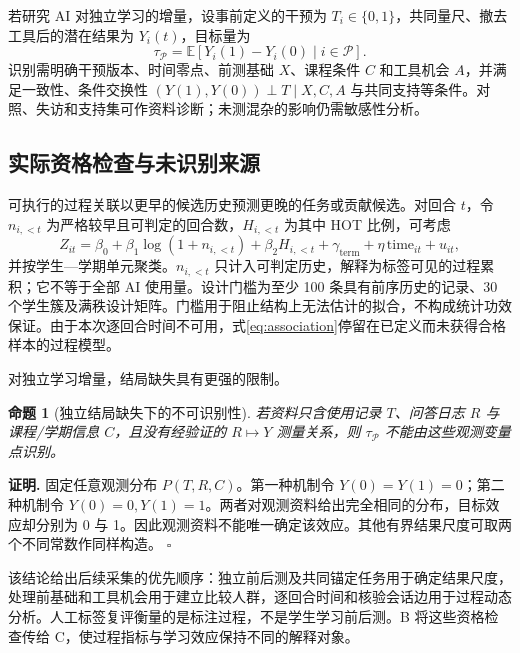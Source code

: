 \documentclass[withoutpreface,bwprint]{cumcmthesis}
\newtheorem{proposition}{命题}[section]
\renewenvironment{proof}{\par\noindent\textbf{证明. }\ignorespaces}{\unskip\hfill$\square$\par}
\newcommand{\E}{\mathbb{E}}
\begin{document}
若研究 AI 对独立学习的增量，设事前定义的干预为 $T_i\in\{0,1\}$，共同量尺、撤去工具后的潜在结果为 $Y_i(t)$，目标量为
\begin{equation}\label{eq:ate}
\tau_{\mathcal P}=\E[Y_i(1)-Y_i(0)\mid i\in\mathcal P].
\end{equation}
识别需明确干预版本、时间零点、前测基础 $X$、课程条件 $C$ 和工具机会 $A$，并满足一致性、条件交换性 $(Y(1),Y(0))\perp T\mid X,C,A$ 与共同支持等条件\cite{hernan2020_whatif}。对照、失访和支持集可作资料诊断；未测混杂的影响仍需敏感性分析\cite{lu2023_sensitivity}。

\subsection{实际资格检查与未识别来源}
\FinalAssociationResults{}

可执行的过程关联以更早的候选历史预测更晚的任务或贡献候选。对回合 $t$，令 $n_{i,<t}$ 为严格较早且可判定的回合数，$H_{i,<t}$ 为其中 HOT 比例，可考虑
\begin{equation}\label{eq:association}
Z_{it}=\beta_0+\beta_1\log(1+n_{i,<t})+\beta_2H_{i,<t}
+\gamma_{\mathrm{term}}+\eta\,\mathrm{time}_{it}+u_{it},
\end{equation}
并按学生—学期单元聚类。$n_{i,<t}$ 只计入可判定历史，解释为标签可见的过程累积；它不等于全部 AI 使用量。设计门槛为至少 100 条具有前序历史的记录、30 个学生簇及满秩设计矩阵。门槛用于阻止结构上无法估计的拟合，不构成统计功效保证。由于本次逐回合时间不可用，式\eqref{eq:association}停留在已定义而未获得合格样本的过程模型。

对独立学习增量，结局缺失具有更强的限制。
\begin{proposition}[独立结局缺失下的不可识别性]\label{prop:noid}
若资料只含使用记录 $T$、问答日志 $R$ 与课程/学期信息 $C$，且没有经验证的 $R\mapsto Y$ 测量关系，则 $\tau_{\mathcal P}$ 不能由这些观测变量点识别。
\end{proposition}
\begin{proof}
固定任意观测分布 $P(T,R,C)$。第一种机制令 $Y(0)=Y(1)=0$；第二种机制令 $Y(0)=0,Y(1)=1$。两者对观测资料给出完全相同的分布，目标效应却分别为 0 与 1。因此观测资料不能唯一确定该效应。其他有界结果尺度可取两个不同常数作同样构造。
\end{proof}

该结论给出后续采集的优先顺序：独立前后测及共同锚定任务用于确定结果尺度，处理前基础和工具机会用于建立比较人群，逐回合时间和核验会话边用于过程动态分析。人工标签复评衡量的是标注过程，不是学生学习前后测。B 将这些资格检查传给 C，使过程指标与学习效应保持不同的解释对象。
\end{document}
